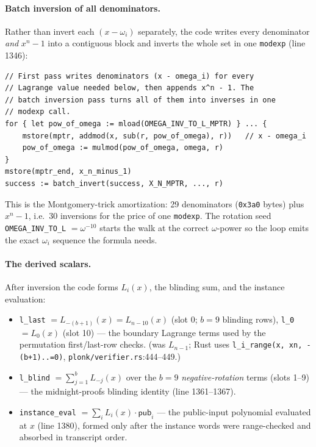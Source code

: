 \paragraph{Batch inversion of all denominators.} Rather than invert
each $(x-\omega_i)$ separately, the code writes every denominator
\emph{and} $x^n-1$ into a contiguous block and inverts the whole
set in one \texttt{modexp} (line 1346):
\begin{lstlisting}[style=yul]
// First pass writes denominators (x - omega_i) for every
// Lagrange value needed below, then appends x^n - 1. The
// batch inversion pass turns all of them into inverses in one
// modexp call.
for { let pow_of_omega := mload(OMEGA_INV_TO_L_MPTR) } ... {
    mstore(mptr, addmod(x, sub(r, pow_of_omega), r))   // x - omega_i
    pow_of_omega := mulmod(pow_of_omega, omega, r)
}
mstore(mptr_end, x_n_minus_1)
success := batch_invert(success, X_N_MPTR, ..., r)
\end{lstlisting}
This is the Montgomery-trick amortization: 29 denominators
(\texttt{0x3a0} bytes) plus $x^n-1$, i.e.\ 30 inversions for
the price of one \texttt{modexp}. The rotation seed
\texttt{OMEGA\_INV\_TO\_L} $=\omega^{-10}$ starts the walk at the correct
$\omega$-power so the loop emits the exact $\omega_i$ sequence the
formula needs.

\paragraph{The derived scalars.} After inversion the code forms
$L_i(x)$, the blinding sum, and the instance evaluation:
\begin{itemize}[leftmargin=1.5em,itemsep=1pt]
  \item \texttt{l\_last} $=L_{-(b+1)}(x)=L_{n-10}(x)$ (slot 0; $b=9$
        blinding rows), \texttt{l\_0} $=L_0(x)$ (slot 10)
        --- the boundary Lagrange terms used by the permutation
        first/last-row checks.  (was
        $L_{n-1}$; Rust uses \texttt{l\_\allowbreak{}i\_\allowbreak{}range(x, xn,
        -(b+1)..=0)}, \texttt{plonk/verifier.rs}:444--449.)
  \item \texttt{l\_blind} $=\sum_{j=1}^{b} L_{-j}(x)$ over the $b=9$
        \emph{negative-rotation} terms (slots 1--9) --- the midnight-proofs
        blinding identity (line 1361--1367).
  \item \texttt{instance\_eval} $=\sum_i L_i(x)\cdot \mathsf{pub}_i$
        --- the public-input polynomial evaluated at $x$ (line
        1380), formed only after the instance words were
        range-checked and absorbed in transcript order.
\end{itemize}

